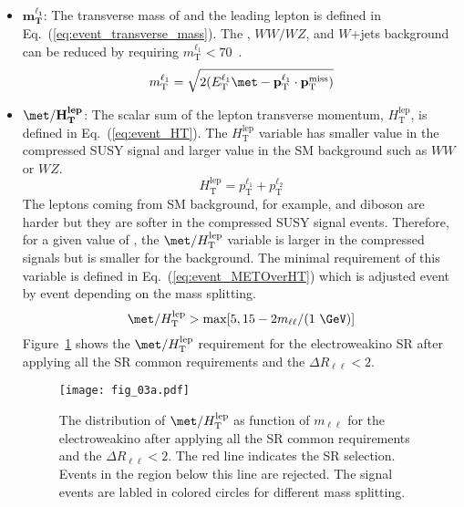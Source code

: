 \begin{itemize}
    \item $\mathbf{m_{T}^{\ell_{1}}}$: The transverse mass of \met and the leading lepton is defined in Eq.~(\ref{eq:event_transverse_mass}).
    The \ttbar, $WW/WZ$, and $W$+jets background can be reduced by requiring $m_{\textrm{T}}^{\ell_{1}} < 70$~{\GeV}.
    \begin{equation}
        m_{\textrm{T}}^{\ell_{1}} = \sqrt{2(E_{\textrm{T}}^{\ell_{1}}\met - \mathbf{p}_{\textrm{T}}^{\ell_{1}} \cdot \mathbf{p}_{\textrm{T}}^{\textrm{miss}})}
        \label{eq:event_transverse_mass}
    \end{equation}

    \item $\mathbf{\met/H_{T}^{lep}}$: The scalar sum of the lepton transverse momentum, $H_{\textrm{T}}^{\textrm{lep}}$, is defined  in Eq.~(\ref{eq:event_HT}).
    The $H_{\textrm{T}}^{\textrm{lep}}$ variable has smaller value in the compressed SUSY signal and larger value in the SM background such as $WW$ or $WZ$.
    \begin{equation}
        H_{\textrm{T}}^{\textrm{lep}} = p_{\textrm{T}}^{\ell_{1}} + p_{\textrm{T}}^{\ell_{2}}
        \label{eq:event_HT}
    \end{equation}
    The leptons coming from SM background, for example, \ttbar and diboson are harder but they are softer in the compressed SUSY signal events.
    Therefore, for a given value of \met, the $\met/H_{\textrm{T}}^{\textrm{lep}}$ variable is larger in the compressed signals but is smaller for the background.
    The minimal requirement of this variable is defined in Eq.~(\ref{eq:event_METOverHT}) which is adjusted event by event depending on the mass splitting.
    \begin{equation}
        \met/H_{\textrm{T}}^{\textrm{lep}} > \mathrm{max}[5, 15 - 2 m_{\ell\ell}/(1~{\GeV})]
        \label{eq:event_METOverHT}
    \end{equation}
    Figure~\ref{fig:event_METOverHT} shows the $\met/H_{\textrm{T}}^{\textrm{lep}}$ requirement for the electroweakino SR after applying all the SR common requirements and the $\Delta R_{\ell\ell} < 2$.
    \begin{figure}[htb]
        \begin{center}
            \texttt{[image: fig\_03a.pdf]}
            \caption{The distribution of $\met/H_{\textrm{T}}^{\textrm{lep}}$ as function of $m_{\ell\ell}$ for the electroweakino after applying all the SR common requirements and the $\Delta R_{\ell\ell} < 2$.
            The red line indicates the SR selection.
            Events in the region below this line are rejected.
            The signal events are labled in colored circles for different mass splitting.}
            \label{fig:event_METOverHT}
        \end{center}
    \end{figure}
\end{itemize}
%

